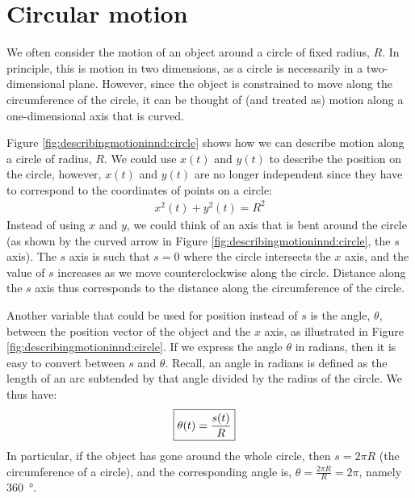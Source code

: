 \section{Circular motion}
\label{sec:describingmotioninnd:circularmotion}
We often consider the motion of an object around a circle of fixed radius, $R$. In principle, this is motion in two dimensions, as a circle is necessarily in a two-dimensional plane. However, since the object is constrained to move along the circumference of the circle, it can be thought of (and treated as) motion along a one-dimensional axis that is curved. 

Figure \ref{fig:describingmotioninnd:circle} shows how we can describe motion along a circle of radius, $R$. We could use $x(t)$ and $y(t)$ to describe the position on the circle, however, $x(t)$ and $y(t)$ are no longer independent since they have to correspond to the coordinates of points on a circle:
\begin{align*}
x^2(t)+y^2(t)=R^2
\end{align*}
Instead of using $x$ and $y$, we could think of an axis that is bent around the circle (as shown by the curved arrow in Figure \ref{fig:describingmotioninnd:circle}, the $s$ axis). The $s$ axis is such that $s=0$ where the circle intersects the $x$ axis, and the value of $s$ increases as we move counterclockwise along the circle. Distance along the $s$ axis thus corresponds to the distance along the circumference of the circle.

Another variable that could be used for position instead of $s$ is the angle, $\theta$, between the position vector of the object and the $x$ axis, as illustrated in Figure \ref{fig:describingmotioninnd:circle}. If we express the angle $\theta$ in radians, then it is easy to convert between $s$ and $\theta$. Recall, an angle in radians is defined as the length of an arc subtended by that angle divided by the radius of the circle. We thus have:
\begin{align}
\label{eqn:describingmotioninnd:raddef}
\Aboxed{\theta(t)=\frac{s(t)}{R}}
\end{align}
In particular, if the object has gone around the whole circle, then $s=2\pi R$ (the circumference of a circle), and the corresponding angle is, $\theta=\frac{2\pi R}{R}=2\pi$, namely \SI{360}{\degree}. 

